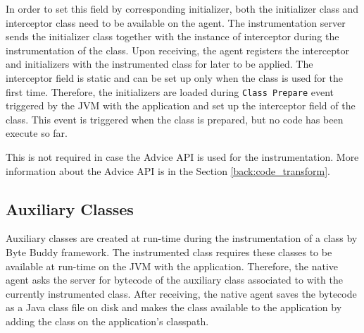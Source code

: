 In order to set this field by corresponding initializer, both the initializer class and interceptor class need to be available on the agent. The instrumentation server sends the initializer class together with the instance of interceptor during the instrumentation of the class. Upon receiving, the agent registers the interceptor and initializers with the instrumented class for later to be applied. The interceptor field is static and can be set up only when the class is used for the first time. Therefore, the initializers are loaded during \texttt{Class Prepare} event triggered by the JVM with the application and set up the interceptor field of the class. This event is triggered when the class is prepared, but no code has been execute so far. 

This is not required in case the Advice API is used for the instrumentation. More information about the Advice API is in the Section \ref{back:code_transform}.

\subsection{Auxiliary Classes}
Auxiliary classes are created at run-time during the instrumentation of a class by Byte Buddy framework. The instrumented class requires these classes to be available at run-time on the JVM with the application. Therefore, the native agent asks the server for bytecode of the auxiliary class associated to with the currently instrumented class. After receiving, the native agent saves the bytecode as a Java class file on disk and makes the class available to the application by adding the class on the application's classpath.

